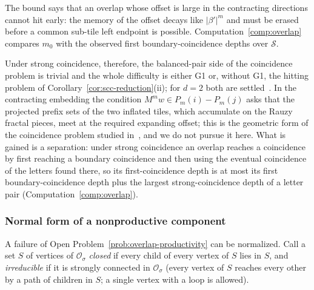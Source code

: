 \documentclass[11pt]{amsart}
\theoremstyle{plain}
\theoremstyle{definition}
\theoremstyle{remark}
\begin{document}
The bound says that an overlap whose offset is large in the contracting directions cannot hit early: the memory of the offset decays like $|\beta'|^m$ and must be erased before a common sub-tile left endpoint is possible. Computation~\ref{comp:overlap} compares $m_0$ with the observed first boundary-coincidence depths over $\mathcal S$.

Under strong coincidence, therefore, the balanced-pair side of the coincidence problem is trivial and the whole difficulty is either G1 or, without G1, the hitting problem of Corollary~\ref{cor:scc-reduction}(ii); for $d=2$ both are settled~\cite{BD,HS}. In the contracting embedding the condition $M^mw\in P_m(i)-P_m(j)$ asks that the projected prefix sets of the two inflated tiles, which accumulate on the Rauzy fractal pieces, meet at the required expanding offset; this is the geometric form of the coincidence problem studied in~\cite{IR,BK,MT}, and we do not pursue it here. What is gained is a separation: under strong coincidence an overlap reaches a coincidence by first reaching a boundary coincidence and then using the eventual coincidence of the letters found there, so its first-coincidence depth is at most its first boundary-coincidence depth plus the largest strong-coincidence depth of a letter pair (Computation~\ref{comp:overlap}).

\subsubsection*{Normal form of a nonproductive component}

A failure of Open Problem~\ref{prob:overlap-productivity} can be normalized. Call a set $S$ of vertices of $\mathcal O_\sigma$ \emph{closed} if every child of every vertex of $S$ lies in $S$, and \emph{irreducible} if it is strongly connected in $\mathcal O_\sigma$ (every vertex of $S$ reaches every other by a path of children in $S$; a single vertex with a loop is allowed).
\end{document}
